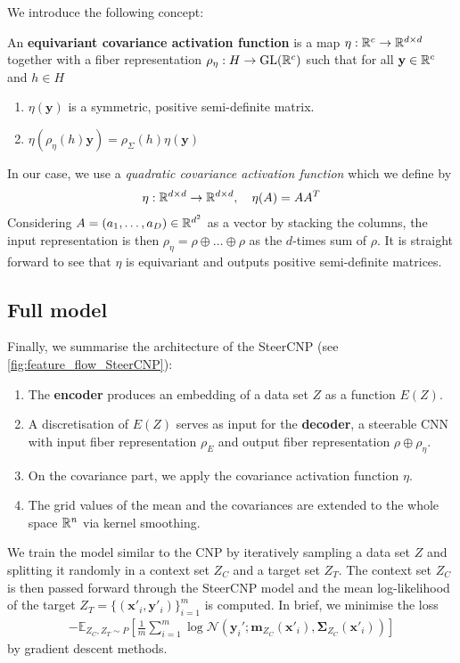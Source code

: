 We introduce the following concept: \begin{definition} An \textbf{equivariant covariance activation function} is a map $\eta:\mathbb{R}^{c}\to\mathbb{R}^{d\times d}$ together with a fiber representation $\rho_{\eta}:H\to\text{GL}(\mathbb{R}^{c})$ such that for all $\mathbf{y}\in\mathbb{R}^c$ and $h\in H$ \begin{enumerate} \item $\eta(\mathbf{y})$ is a symmetric, positive semi-definite matrix.
		\item $\eta(\rho_\eta(h)\mathbf{y})=\rho_{\Sigma}(h)\eta(\mathbf{y})$
	\end{enumerate}
\end{definition}
In our case, we use a \emph{quadratic covariance activation function} which we define by \begin{align*} \eta:\mathbb{R}^{d\times d}\to\mathbb{R}^{d\times d},\quad \eta(A)=AA^T \end{align*} Considering $A=(a_1,\dots,a_D)\in\mathbb{R}^{d^2}$ as a vector by stacking the columns, the input representation is then $\rho_{\eta}=\rho\oplus\dots\oplus\rho$ as the $d$-times sum of $\rho$.
It is straight forward to see that $\eta$ is equivariant and outputs positive semi-definite matrices.
\subsection{Full model}
Finally, we summarise the architecture of the SteerCNP (see \cref{fig:feature_flow_SteerCNP}): \begin{enumerate} \item The \textbf{encoder} produces an embedding of a data set $Z$ as a function $E(Z)$.
	\item A discretisation of $E(Z)$ serves as input for the \textbf{decoder}, a steerable CNN with input fiber representation $\rho_{E}$ and output fiber representation $\rho\oplus\rho_{\eta}$.
	\item On the covariance part, we apply the covariance activation function $\eta$.
	\item The grid values of the mean and the covariances are extended to the whole space $\mathbb{R}^n$ via kernel smoothing.
\end{enumerate}
We train the model similar to the CNP by iteratively sampling a data set $Z$ and splitting it randomly in a context set $Z_C$ and a target set $Z_T$.
The context set $Z_C$ is then passed forward through the SteerCNP model and the mean log-likelihood of the target $Z_T=\{(\mathbf{x}'_i,\mathbf{y}'_i)\}_{i=1}^{m}$ is computed.
In brief, we minimise the loss \begin{align*} -\mathbb{E}_{Z_C,Z_T\sim P}\left[\frac{1}{m} \sum\limits_{i=1}^{m}\log\mathcal{N}(\mathbf{y}_i';\mathbf{m}_{Z_C}(\mathbf{x}'_i),\mathbf{\Sigma}_{Z_C}(\mathbf{x}'_i)) \right] \end{align*} by gradient descent methods.

